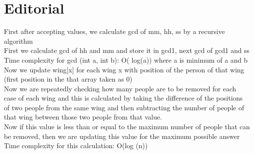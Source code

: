 \documentclass[12pt]{article}
\begin{document}
\section*{Editorial}
First after accepting values, we calculate gcd of mm, hh, ss by a recursive algorithm\\
First we calculate gcd of hh and mm and store it in gcd1, next gcd of gcd1 and ss\\
Time complexity for gcd (int a, int b): O( log(a)) where a is minimum of a and b\\
Now we update wing[x] for each wing x with position of the person of that wing (first position in the that array taken as 0)\\
Now we are repeatedly checking how many people are to be removed for each case of each wing and this is calculated by taking the difference of the positions of two people from the same wing and then subtracting the number of people of that wing between those two people from that value. \\
Now if this value is less than or equal to the maximum number of people that can be removed, then we are updating this value for the maximum possible answer\\
Time complexity for this calculation: O(log (n))
\end{document}
